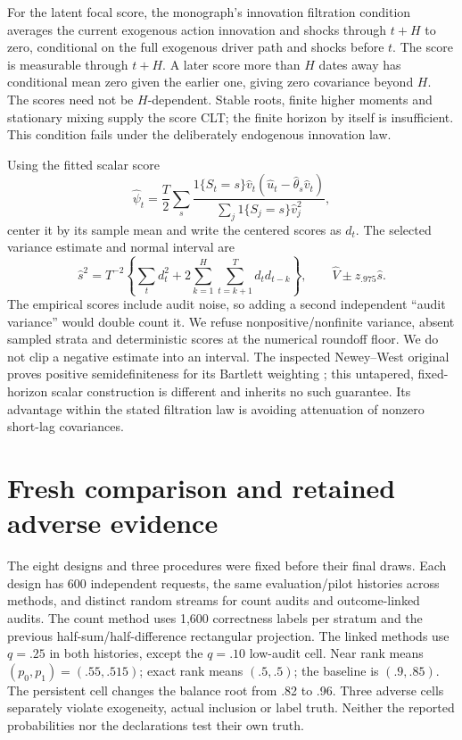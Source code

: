 For the latent focal score, the monograph's innovation filtration condition
averages the current exogenous action innovation and shocks through $t+H$
to zero, conditional on the full exogenous driver path and shocks before $t$.
The score is measurable through $t+H$. A later score more than $H$ dates away
has conditional mean zero given the earlier one, giving zero covariance
beyond $H$. The scores need not be $H$-dependent. Stable roots, finite higher
moments and stationary mixing supply the score CLT; the finite horizon by
itself is insufficient. This condition fails under the deliberately endogenous
innovation law.

Using the fitted scalar score
\begin{equation}
 \widehat\psi_t=\frac{T}{2}
 \sum_s\frac{1\{S_t=s\}\widehat v_t
   (\widehat u_t-\widehat\theta_s\widehat v_t)}
  {\sum_j1\{S_j=s\}\widehat v_j^2},
\end{equation}
center it by its sample mean and write the centered scores as $d_t$.
The selected variance estimate and normal interval are
\begin{equation}
 \widehat s^2=T^{-2}\!\left\{\sum_t d_t^2+
       2\sum_{k=1}^{H}\sum_{t=k+1}^{T}d_td_{t-k}\right\},
 \qquad \widehat V\pm z_{.975}\widehat s.\label{integrated:linked_funding:eq:variance}
\end{equation}
The empirical scores include audit noise, so adding a second independent
``audit variance'' would double count it. We refuse nonpositive/nonfinite
variance, absent sampled strata and deterministic scores at the numerical
roundoff floor. We do not clip a negative estimate into an interval.
The inspected Newey--West original proves positive semidefiniteness for its
Bartlett weighting \cite{newey1986}; this untapered, fixed-horizon scalar
construction is different and inherits no such guarantee. Its advantage
within the stated filtration law is avoiding attenuation of nonzero short-lag
covariances.

\section{Fresh comparison and retained adverse evidence}

The eight designs and three procedures were fixed before their final draws.
Each design has 600 independent requests, the same evaluation/pilot histories
across methods, and distinct random streams for count audits and outcome-linked
audits. The count method uses 1,600 correctness labels per stratum and the
previous half-sum/half-difference rectangular projection. The linked methods
use $q=.25$ in both histories, except the $q=.10$ low-audit cell. Near rank
means $(p_0,p_1)=(.55,.515)$; exact rank means $(.5,.5)$; the baseline is
$(.9,.85)$. The persistent cell changes the balance root from .82 to .96.
Three adverse cells separately violate exogeneity, actual inclusion or
label truth. Neither the reported probabilities nor the declarations test
their own truth.

